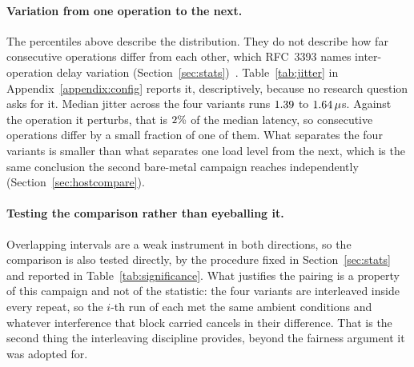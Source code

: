 \documentclass[english,oneside,a4paper,censored,csm,software-track-2020]{HYthesisML}
\begin{document}
\paragraph{Variation from one operation to the next.}
The percentiles above describe the distribution. They do not describe how far consecutive
operations differ from each other, which RFC~3393 names inter-operation delay variation
(Section~\ref{sec:stats})~\cite{rfc3393}. Table~\ref{tab:jitter} in
Appendix~\ref{appendix:config} reports it, descriptively, because no research question asks for it.
Median jitter across the four variants runs $1.39$ to $1.64\,\mu$s. Against the
operation it perturbs, that is $2\%$ of the median latency, so consecutive
operations differ by a small fraction of one of them. What separates the four variants is smaller
than what separates one load level from the next, which is the same conclusion the second
bare-metal campaign reaches independently (Section~\ref{sec:hostcompare}).

\paragraph{Testing the comparison rather than eyeballing it.}
Overlapping intervals are a weak instrument in both directions, so the comparison is also tested
directly, by the procedure fixed in Section~\ref{sec:stats} and reported in
Table~\ref{tab:significance}. What justifies the pairing is a property of this campaign and not of
the statistic: the four variants are interleaved inside every repeat, so the $i$-th run of each met
the same ambient conditions and whatever interference that block carried cancels in their
difference. That is the second thing the interleaving discipline provides, beyond the fairness argument
it was adopted for.
\end{document}
